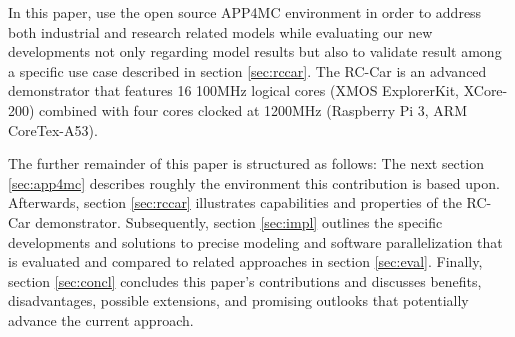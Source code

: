 \documentclass [a4paper,final,conference,10pt]{IDAACS}
\begin{document}
In this paper, use the open source APP4MC environment in order to address both industrial and research related models while evaluating our new developments not only regarding model results but also to validate result among a specific use case described in section \ref{sec:rccar}. The RC-Car is an advanced demonstrator that features 16 100MHz logical cores (XMOS ExplorerKit, XCore-200) 
combined with four cores clocked at 1200MHz (Raspberry Pi 3, ARM CoreTex-A53).

The further remainder of this paper is structured as follows: The next section \ref{sec:app4mc} describes roughly the environment this contribution is based upon. Afterwards, section \ref{sec:rccar} illustrates capabilities and properties of the RC-Car demonstrator. Subsequently, section \ref{sec:impl} outlines the specific developments and solutions to precise modeling and software parallelization that is evaluated and compared to related approaches in section \ref{sec:eval}. Finally, section \ref{sec:concl} concludes this paper's contributions and discusses benefits, disadvantages, possible extensions, and promising outlooks that potentially advance the current approach.
\end{document}
